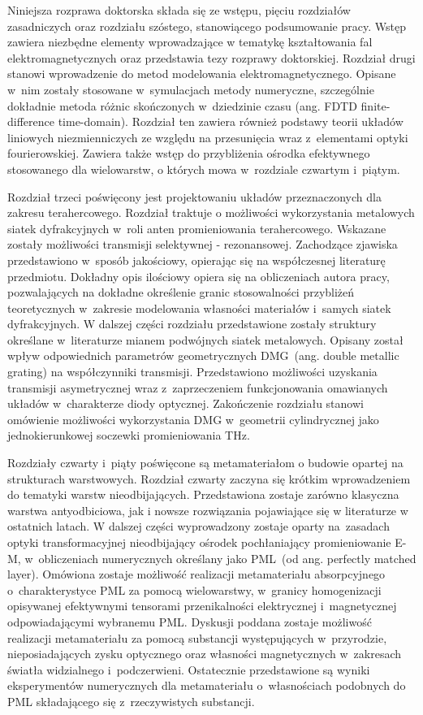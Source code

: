 Niniejsza rozprawa doktorska składa się ze wstępu, pięciu rozdziałów zasadniczych oraz rozdziału szóstego, stanowiącego podsumowanie pracy. Wstęp zawiera niezbędne elementy wprowadzające w tematykę kształtowania fal elektromagnetycznych oraz przedstawia tezy rozprawy doktorskiej. Rozdział drugi stanowi wprowadzenie do metod modelowania elektromagnetycznego. Opisane w~nim zostały stosowane w~symulacjach metody numeryczne, szczególnie dokładnie metoda różnic skończonych w~dziedzinie czasu (ang. FDTD finite-difference time-domain). Rozdział ten zawiera również podstawy teorii układów liniowych niezmienniczych ze względu na przesunięcia wraz z~elementami optyki fourierowskiej. Zawiera także wstęp do przybliżenia ośrodka efektywnego stosowanego dla wielowarstw, o których mowa w~rozdziale czwartym i~piątym.

Rozdział trzeci poświęcony jest projektowaniu układów przeznaczonych dla zakresu terahercowego. Rozdział traktuje o możliwości wykorzystania metalowych siatek dyfrakcyjnych w~roli anten promieniowania terahercowego. Wskazane zostały możliwości transmisji  selektywnej - rezonansowej. Zachodzące zjawiska przedstawiono w~sposób jakościowy, opierając się na współczesnej literaturę przedmiotu. Dokładny opis ilościowy opiera się na obliczeniach autora pracy, pozwalających na dokładne określenie granic stosowalności przybliżeń teoretycznych w~zakresie modelowania własności materiałów i~samych siatek dyfrakcyjnych. W dalszej części rozdziału przedstawione zostały struktury określane w~literaturze mianem podwójnych siatek metalowych. Opisany został wpływ odpowiednich parametrów geometrycznych DMG~(ang. double metallic grating) na współczynniki transmisji. Przedstawiono możliwości uzyskania transmisji asymetrycznej wraz z~zaprzeczeniem funkcjonowania omawianych układów w~charakterze diody optycznej. Zakończenie rozdziału stanowi omówienie możliwości wykorzystania DMG w~geometrii cylindrycznej jako jednokierunkowej soczewki promieniowania THz.

Rozdziały czwarty i~piąty poświęcone są metamateriałom o budowie opartej na strukturach warstwowych. Rozdział czwarty zaczyna się krótkim wprowadzeniem do tematyki warstw nieodbijających. Przedstawiona zostaje zarówno klasyczna warstwa antyodbiciowa, jak i nowsze rozwiązania pojawiające się w literaturze w ostatnich latach. W dalszej części wyprowadzony zostaje oparty na~zasadach optyki transformacyjnej nieodbijający ośrodek pochłaniający promieniowanie E-M, w~obliczeniach numerycznych określany jako PML~(od ang. perfectly matched layer). Omówiona zostaje możliwość realizacji metamateriału absorpcyjnego o~charakterystyce PML za pomocą wielowarstwy, w~granicy homogenizacji opisywanej efektywnymi tensorami przenikalności elektrycznej i~magnetycznej odpowiadającymi wybranemu PML. Dyskusji poddana zostaje możliwość realizacji metamateriału za pomocą substancji występujących w~przyrodzie, nieposiadających zysku optycznego oraz własności magnetycznych w~zakresach światła widzialnego i~podczerwieni. Ostatecznie przedstawione są wyniki eksperymentów numerycznych dla metamateriału o~własnościach podobnych do PML składającego się z~rzeczywistych substancji.

